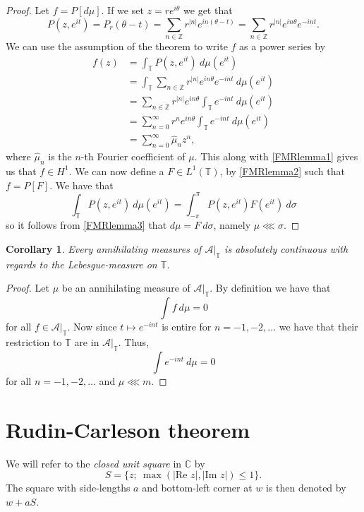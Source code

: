\documentclass[a4paper,12pt,twoside,BCOR=10mm]{scrbook}
\newtheorem{corollary}[theorem]{Corollary}
\theoremstyle{definition}
\theoremstyle{definition}
\theoremstyle{definition}
\renewcommand{\Re}{\text{Re }}
\renewcommand{\Im}{\text{Im }}
\begin{document}
\begin{proof}
Let $f = P[d\mu]$.
If we set $z = re^{i\theta}$ we get that
\[
	P(z, e^{it})
		= P_r(\theta - t)
		= \sum_{n \in \mathbb{Z}} r^{|n|}e^{in(\theta - t)}
		= \sum_{n \in \mathbb{Z}} r^{|n|}e^{in\theta}e^{-int}.
\]
We can use the assumption of the theorem to write $f$ as a power series by
\begin{align*}
	f(z) 
	&= \int_{\mathbb{T}} P(z, e^{it})\ d\mu(e^{it}) \\
	&= \int_{\mathbb{T}} \sum_{n \in \mathbb{Z}} r^{|n|}e^{in\theta}e^{-int}\ d\mu(e^{it}) \\
	&= \sum_{n \in \mathbb{Z}} r^{|n|}e^{in\theta} \int_{\mathbb{T}} e^{-int}\ d\mu(e^{it}) \\
	&= \sum_{n = 0}^{\infty} r^n e^{in\theta} \int_{\mathbb{T}} e^{-int}\ d\mu(e^{it}) \\
	&= \sum_{n = 0}^{\infty} \hat{\mu}_n z^n,
\end{align*}
where $\hat{\mu}_n$ is the $n$-th Fourier coefficient of $\mu$.
This along with \ref{FMRlemma1} gives us that $f \in H^1$.
We can now define a $F \in L^1(\mathbb{T})$, by \ref{FMRlemma2} such that $f = P[F]$.
We have that
\[
	\int_{\mathbb{T}} P(z, e^{it})\ d\mu(e^{it})
	=
	\int_{-\pi}^{\pi} P(z, e^{it}) F(e^{it})\ d\sigma
\]
so it follows from \ref{FMRlemma3} that $d\mu = F\ d\sigma$, namely $\mu \lll \sigma$.
\end{proof}
\begin{corollary}
\label{fmrieszcor}
Every annihilating measures of $\mathcal{A}|_{\mathbb{T}}$ is absolutely continuous with regards to the Lebesgue-measure on $\mathbb{T}$.
\end{corollary}
\begin{proof}
Let $\mu$ be an annihilating measure of $\mathcal{A}|_{\mathbb{T}}$.
By definition we have that
\[
	\int f\ d\mu = 0
\]
for all $f \in \mathcal{A}|_{\mathbb{T}}$.
Now since $t \mapsto e^{-int}$ is entire for $n = -1, -2, ...$ we have that their restriction to $\mathbb{T}$ are in $\mathcal{A}|_{\mathbb{T}}$.
Thus,
\[
	\int e^{-int}\ d\mu = 0
\]
for all $n = -1, -2, ...$ and $\mu \lll m$.
\end{proof}



\section{Rudin-Carleson theorem}
\label{section2}
We will refer to the \emph{closed unit square} in $\mathbb{C}$ by
\[
	S = \{z;\ \max(|\Re z|, |\Im z|) \leq 1\}.
\]
The square with side-lengths $a$ and bottom-left corner at $w$ is then denoted by $w + aS$.
\end{document}
